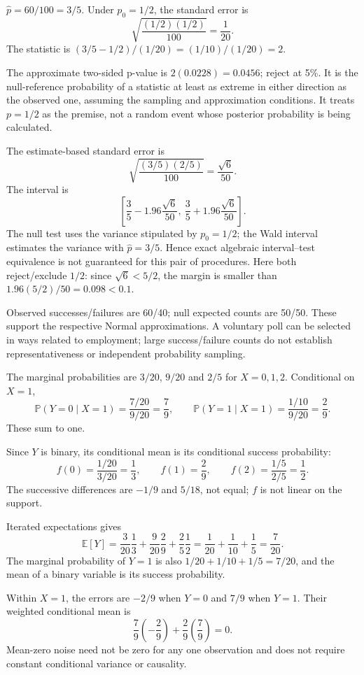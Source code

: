 \documentclass[11pt]{article}
\begin{document}
\begin{parts}
\item $\widehat p=60/100=3/5$. Under $p_0=1/2$, the standard error is
\[
\sqrt{\frac{(1/2)(1/2)}{100}}=\frac1{20}.
\]
The statistic is $(3/5-1/2)/(1/20)=(1/10)/(1/20)=2$.
\item The approximate two-sided p-value is $2(0.0228)=0.0456$; reject at 5\%. It is the null-reference probability of a statistic at least as extreme in either direction as the observed one, assuming the sampling and approximation conditions. It treats $p=1/2$ as the premise, not a random event whose posterior probability is being calculated.
\item The estimate-based standard error is
\[
\sqrt{\frac{(3/5)(2/5)}{100}}=\frac{\sqrt6}{50}.
\]
The interval is
\[
\left[\frac35-1.96\frac{\sqrt6}{50},\ \frac35+1.96\frac{\sqrt6}{50}\right].
\]
The null test uses the variance stipulated by $p_0=1/2$; the Wald interval estimates the variance with $\widehat p=3/5$. Hence exact algebraic interval--test equivalence is not guaranteed for this pair of procedures. Here both reject/exclude $1/2$: since $\sqrt6<5/2$, the margin is smaller than $1.96(5/2)/50=0.098<0.1$.
\item Observed successes/failures are 60/40; null expected counts are 50/50. These support the respective Normal approximations. A voluntary poll can be selected in ways related to employment; large success/failure counts do not establish representativeness or independent probability sampling.
\end{parts}

\begin{parts}
\item The marginal probabilities are $3/20$, $9/20$ and $2/5$ for $X=0,1,2$. Conditional on $X=1$,
\[
\mathbb P(Y=0\mid X=1)=\frac{7/20}{9/20}=\frac79,\qquad
\mathbb P(Y=1\mid X=1)=\frac{1/10}{9/20}=\frac29.
\]
These sum to one.
\item Since $Y$ is binary, its conditional mean is its conditional success probability:
\[
f(0)=\frac{1/20}{3/20}=\frac13,\qquad f(1)=\frac29,\qquad
f(2)=\frac{1/5}{2/5}=\frac12.
\]
The successive differences are $-1/9$ and $5/18$, not equal; $f$ is not linear on the support.
\item Iterated expectations gives
\[
\mathbb E[Y]=\frac3{20}\frac13+\frac9{20}\frac29+\frac25\frac12
=\frac1{20}+\frac1{10}+\frac15=\frac7{20}.
\]
The marginal probability of $Y=1$ is also $1/20+1/10+1/5=7/20$, and the mean of a binary variable is its success probability.
\item Within $X=1$, the errors are $-2/9$ when $Y=0$ and $7/9$ when $Y=1$. Their weighted conditional mean is
\[
\frac79\left(-\frac29\right)+\frac29\left(\frac79\right)=0.
\]
Mean-zero noise need not be zero for any one observation and does not require constant conditional variance or causality.
\end{parts}
\end{document}
